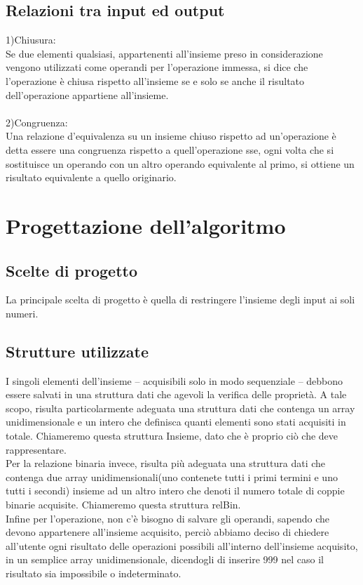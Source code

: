 ﻿\documentclass[11pt, a4paper, titlepage, block]{article}
\begin{document}
	\subsection{Relazioni tra input ed output}
	1)Chiusura:\\
	Se due elementi qualsiasi, appartenenti all'insieme preso in considerazione vengono utilizzati come operandi per l'operazione immessa, si dice che l'operazione è chiusa rispetto all'insieme se e solo se anche il risultato dell'operazione appartiene all'insieme.
	\\
	\\
	2)Congruenza:\\Una relazione d'equivalenza su un insieme chiuso rispetto ad un'operazione è detta essere una congruenza
	rispetto a quell'operazione sse, ogni volta che si sostituisce un operando con un altro operando
	equivalente al primo, si ottiene un risultato equivalente a quello originario.
	\newpage
	\section{Progettazione dell'algoritmo}
	\subsection{Scelte di progetto}
	La principale scelta di progetto è quella di restringere l'insieme degli input ai soli numeri.
	\subsection{Strutture utilizzate}
	I singoli elementi dell'insieme – acquisibili solo in modo sequenziale – debbono essere salvati in una struttura
	dati che agevoli la verifica delle proprietà.  A tale scopo, risulta particolarmente
	adeguata una struttura dati che contenga un array unidimensionale e un intero che definisca quanti elementi sono stati acquisiti in totale. Chiameremo questa struttura Insieme, dato che è proprio ciò che deve rappresentare.
	\\
	Per la relazione binaria invece, risulta più adeguata una struttura dati che contenga due array unidimensionali(uno contenete tutti i primi termini e uno tutti i secondi) insieme ad un altro intero che denoti il numero totale di coppie binarie acquisite. Chiameremo questa struttura relBin.
	\\
	Infine per l'operazione, non c'è bisogno di salvare gli operandi, sapendo che devono appartenere all'insieme acquisito, perciò abbiamo deciso di chiedere all'utente ogni risultato delle operazioni possibili all'interno dell'insieme acquisito, in un semplice array unidimensionale, dicendogli di inserire 999 nel caso il risultato sia impossibile o indeterminato.
	\\
\end{document}
